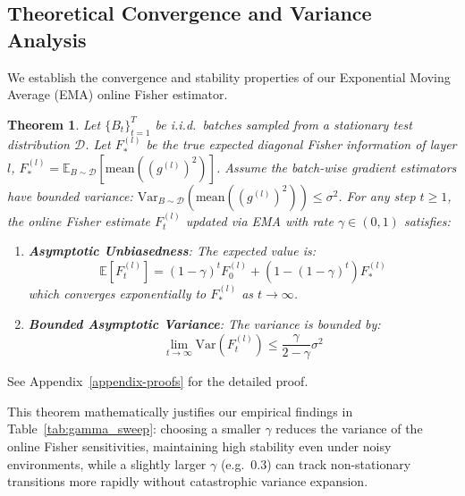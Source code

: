 \documentclass{article}
\theoremstyle{plain}
\newtheorem{theorem}{Theorem}[section]
\theoremstyle{definition}
\begin{document}
\subsection{Theoretical Convergence and Variance Analysis}
We establish the convergence and stability properties of our Exponential Moving Average (EMA) online Fisher estimator.
\begin{theorem}
Let $\{B_t\}_{t=1}^T$ be i.i.d.\ batches sampled from a stationary test distribution $\mathcal{D}$. Let $F_*^{(l)}$ be the true expected diagonal Fisher information of layer $l$, $F_*^{(l)} = \mathbb{E}_{B \sim \mathcal{D}}[\text{mean}((g^{(l)})^2)]$.
Assume the batch-wise gradient estimators have bounded variance: $\text{Var}_{B \sim \mathcal{D}}(\text{mean}((g^{(l)})^2)) \leq \sigma^2$.
For any step $t \geq 1$, the online Fisher estimate $F_t^{(l)}$ updated via EMA with rate $\gamma \in (0, 1)$ satisfies:
\begin{enumerate}
    \item \textbf{Asymptotic Unbiasedness}: The expected value is:
    \begin{equation}
        \mathbb{E}[F_t^{(l)}] = (1 - \gamma)^t F_0^{(l)} + (1 - (1 - \gamma)^t) F_*^{(l)}
    \end{equation}
    which converges exponentially to $F_*^{(l)}$ as $t \to \infty$.
    \item \textbf{Bounded Asymptotic Variance}: The variance is bounded by:
    \begin{equation}
        \lim_{t \to \infty} \text{Var}(F_t^{(l)}) \leq \frac{\gamma}{2 - \gamma} \sigma^2
    \end{equation}
\end{enumerate}
\end{theorem}
See Appendix~\ref{appendix-proofs} for the detailed proof.

This theorem mathematically justifies our empirical findings in Table~\ref{tab:gamma_sweep}: choosing a smaller $\gamma$ reduces the variance of the online Fisher sensitivities, maintaining high stability even under noisy environments, while a slightly larger $\gamma$ (e.g.\ 0.3) can track non-stationary transitions more rapidly without catastrophic variance expansion.
\end{document}
